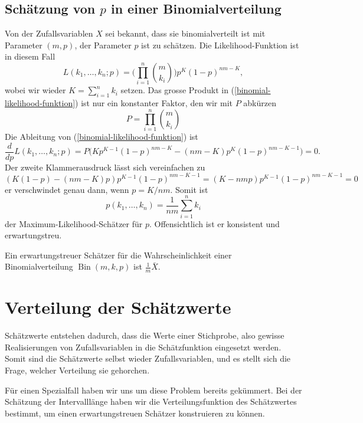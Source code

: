 \subsection{Schätzung von \texorpdfstring{$p$}{p} in einer Binomialverteilung}
Von der Zufallsvariablen $X$ sei bekannt, dass sie binomialverteilt ist
mit Parameter $(m, p)$, der Parameter $p$ ist zu schätzen.
Die Likelihood-Funktion ist in diesem Fall
\begin{equation}
L(k_1,\dots,k_n;p)=\biggl(\prod_{i=1}^n\binom{m}{k_i}\biggr)
p^{K}(1-p)^{nm-K},
\label{binomial-likelihood-funktion}
\end{equation}
wobei wir wieder $K=\sum_{i=1}^nk_i$ setzen. 
Das grosse Produkt in (\ref{binomial-likelihood-funktion})
ist nur ein konstanter Faktor, den wir mit $P$ abkürzen
\begin{equation}
P= \prod_{i=1}^n\binom{m}{k_i}
\end{equation}
Die Ableitung von (\ref{binomial-likelihood-funktion}) ist
\begin{equation}
\frac{d}{dp}L(k_1,\dots,k_n;p)=P
\bigl(Kp^{K-1}(1-p)^{nm-K}-(nm-K)p^K(1-p)^{nm-K-1}\bigr)=0.
\end{equation}
Der zweite Klammerausdruck lässt sich vereinfachen zu
\[
(K(1-p)-(nm-K)p)p^{K-1}(1-p)^{nm-K-1}=
(K-nmp)p^{K-1}(1-p)^{nm-K-1}=0
\]
er verschwindet genau dann, wenn $p=K/nm$.
Somit ist
\begin{equation}
p(k_1,\dots,k_n)=\frac1{nm}\sum_{i=1}^nk_i
\end{equation}
der Maximum-Likelihood-Schätzer für $p$.
Offensichtlich ist er konsistent
und erwartungstreu.
\begin{satz}
Ein erwartungstreuer Schätzer für die Wahrscheinlichkeit einer
Binomialverteilung $\operatorname{Bin}(m,k,p)$ ist
$\frac1{m}\bar X$.
\end{satz}

\section{Verteilung der Schätzwerte} \label{section-verteilung-der-schaetzwerte}
Schätzwerte entstehen dadurch, dass die Werte einer Stichprobe, also
gewisse Realisierungen von Zufallsvariablen in die Schätzfunktion
eingesetzt werden.
Somit sind die Schätzwerte selbst wieder Zufallsvariablen,
und es stellt sich die Frage, welcher Verteilung sie gehorchen.

Für einen Spezialfall haben wir uns um diese Problem bereits gekümmert.
Bei der Schätzung der Intervalllänge haben wir die Verteilungsfunktion
des Schätzwertes bestimmt, um einen erwartungstreuen Schätzer konstruieren
zu können.

